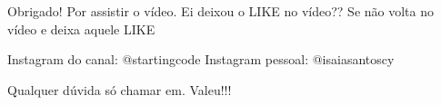 Obrigado! Por assistir o vídeo.
Ei deixou o LIKE no vídeo?? Se não
volta no vídeo e deixa aquele LIKE

Instagram do canal: @startingcode
Instagram pessoal: @isaiasantoscy

Qualquer dúvida só chamar em.
Valeu!!!